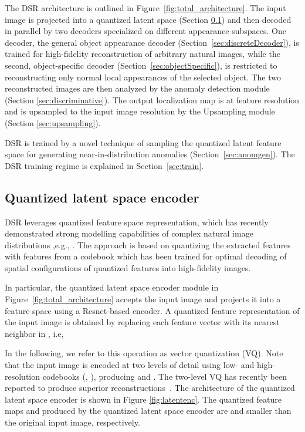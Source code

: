 \documentclass[runningheads]{llncs}
\begin{document}
The DSR architecture is outlined in Figure~\ref{fig:total_architecture}. The input image is projected into a quantized latent space (Section \ref{sec:discreteEncoder}) and then decoded in parallel by two decoders specialized on different appearance subspaces. One decoder, the general object appearance decoder (Section~\ref{sec:discreteDecoder}), is trained for high-fidelity reconstruction of arbitrary natural images, while the second, object-specific decoder (Section~\ref{sec:objectSpecific}), is restricted to reconstructing only normal local appearances of the selected object. The two reconstructed images are then analyzed by the anomaly detection module (Section \ref{sec:discriminative}). The output localization map is at feature resolution and is
upsampled to the input image resolution by the Upsampling module (Section \ref{sec:upsampling}).

DSR is trained by a novel technique of sampling the quantized latent feature space for generating near-in-distribution anomalies (Section~\ref{sec:anomgen}). The DSR training regime is explained in Section~\ref{sec:train}.


\subsection{Quantized latent space encoder}
\label{sec:discreteEncoder}

DSR leverages quantized feature space representation, which has recently demonstrated strong modelling capabilities of complex natural image distributions
,e.g., \cite{Esser_2021_CVPR,ramesh2021zero}. The approach is based on quantizing the extracted features with features from a codebook  which has been trained for optimal decoding of spatial configurations of quantized features into high-fidelity images.


In particular, the quantized latent space encoder module in Figure~\ref{fig:total_architecture} accepts the input image  and projects it into a feature space  using a Resnet-based encoder. A quantized feature representation  of the input image is obtained by replacing each feature vector  with its nearest neighbor  in , i.e,

In the following, we refer to this operation as vector quantization (VQ). 
Note that the input image is encoded at two levels of detail using low- and high-resolution codebooks (, ), producing  and . The two-level VQ has recently been reported to produce superior reconstructions~\cite{vqvae2}. The architecture of the quantized latent space encoder is shown in Figure \ref{fig:latentenc}. The quantized feature maps  and  produced by the quantized latent space encoder are  and  smaller than the original input image, respectively.
\end{document}
